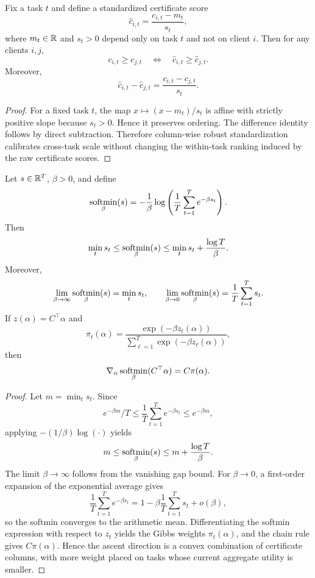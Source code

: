 \begin{proposition}
\label{prop:task-standardization}
Fix a task $t$ and define a standardized certificate score
\[
\hat{c}_{i,t}=\frac{c_{i,t}-m_t}{s_t},
\]
where $m_t \in \mathbb{R}$ and $s_t>0$ depend only on task $t$ and not on client $i$. Then for any clients $i,j$,
\[
c_{i,t} \ge c_{j,t}
\quad \Longleftrightarrow \quad
\hat{c}_{i,t} \ge \hat{c}_{j,t}.
\]
Moreover,
\[
\hat{c}_{i,t}-\hat{c}_{j,t}
=
\frac{c_{i,t}-c_{j,t}}{s_t}.
\]
\end{proposition}

\begin{proof}
For a fixed task $t$, the map $x \mapsto (x-m_t)/s_t$ is affine with strictly positive slope because $s_t>0$. Hence it preserves ordering. The difference identity follows by direct subtraction. Therefore column-wise robust standardization calibrates cross-task scale without changing the within-task ranking induced by the raw certificate scores.
\end{proof}

\begin{proposition}
\label{prop:softmin}
Let $s \in \mathbb{R}^T$, $\beta>0$, and define
\[
\operatorname*{softmin}_{\beta}(s)
= -\frac{1}{\beta}\log\left(\frac{1}{T}\sum_{t=1}^T e^{-\beta s_t}\right).
\]
Then
\[
\min_t s_t \le \operatorname*{softmin}_{\beta}(s) \le \min_t s_t + \frac{\log T}{\beta}.
\]
Moreover,
\[
\lim_{\beta \to \infty}\operatorname*{softmin}_{\beta}(s)=\min_t s_t,
\qquad
\lim_{\beta \to 0}\operatorname*{softmin}_{\beta}(s)=\frac{1}{T}\sum_{t=1}^T s_t.
\]
If $z(\alpha)=C^\top\alpha$ and
\[
\pi_t(\alpha)=\frac{\exp(-\beta z_t(\alpha))}{\sum_{\ell=1}^T \exp(-\beta z_\ell(\alpha))},
\]
then
\[
\nabla_\alpha \operatorname*{softmin}_{\beta}(C^\top\alpha)=C\pi(\alpha).
\]
\end{proposition}

\begin{proof}
Let $m=\min_t s_t$. Since
\[
e^{-\beta m}/T \le \frac{1}{T}\sum_{t=1}^T e^{-\beta s_t} \le e^{-\beta m},
\]
applying $-(1/\beta)\log(\cdot)$ yields
\[
m \le \operatorname*{softmin}_{\beta}(s) \le m+\frac{\log T}{\beta}.
\]
The limit $\beta \to \infty$ follows from the vanishing gap bound. For $\beta \to 0$, a first-order expansion of the exponential average gives
\[
\frac{1}{T}\sum_{t=1}^T e^{-\beta s_t}
=
1-\beta \frac{1}{T}\sum_{t=1}^T s_t + o(\beta),
\]
so the softmin converges to the arithmetic mean. Differentiating the softmin expression with respect to $z_t$ yields the Gibbs weights $\pi_t(\alpha)$, and the chain rule gives $C\pi(\alpha)$. Hence the ascent direction is a convex combination of certificate columns, with more weight placed on tasks whose current aggregate utility is smaller.
\end{proof}

